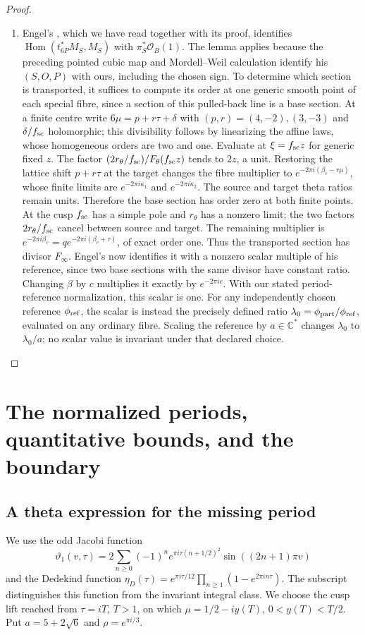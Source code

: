 \begin{proof}
\begin{enumerate}[label=\arabic*.,leftmargin=*]
\item Engel's \cite[Lemma 2.1]{Engel2026}, which we have read together with its proof, identifies $\operatorname{Hom}(t_{6P}^*M_S,M_S)$ with $\pi_S^*\mathcal O_B(1)$. The lemma applies because the preceding pointed cubic map and Mordell--Weil calculation identify his $(S,O,P)$ with ours, including the chosen sign. To determine which section is transported, it suffices to compute its order at one generic smooth point of each special fibre, since a section of this pulled-back line is a base section. At a finite centre write $6\mu=p+r\tau+\delta$ with $(p,r)=(4,-2),(3,-3)$ and $\delta/f_{\rm sc}$ holomorphic; this divisibility follows by linearizing the affine laws, whose homogeneous orders are two and one. Evaluate at $\xi=f_{\rm sc}z$ for generic fixed $z$. The factor $(2r_\theta/f_{\rm sc})/F_\theta(f_{\rm sc}z)$ tends to $2z$, a unit. Restoring the lattice shift $p+r\tau$ at the target changes the fibre multiplier to $e^{-2\pi i(\beta_c-r\mu)}$, whose finite limits are $e^{-2\pi i\kappa_1}$ and $e^{-2\pi i\kappa_2}$. The source and target theta ratios remain units. Therefore the base section has order zero at both finite points. At the cusp $f_{\rm sc}$ has a simple pole and $r_\theta$ has a nonzero limit; the two factors $2r_\theta/f_{\rm sc}$ cancel between source and target. The remaining multiplier is
$e^{-2\pi i\beta_c}=q e^{-2\pi i(\beta_c+\tau)}$, of exact order one. Thus the transported section has divisor $F_\infty$. Engel's \cite[Corollary 2.2]{Engel2026} now identifies it with a nonzero scalar multiple of his reference, since two base sections with the same divisor have constant ratio. Changing $\beta$ by $c$ multiplies it exactly by $e^{-2\pi ic}$. With our stated period-reference normalization, this scalar is one. For any independently chosen reference $\phi_{\rm ref}$, the scalar is instead the precisely defined ratio $\lambda_0=\phi_{\rm part}/\phi_{\rm ref}$, evaluated on any ordinary fibre. Scaling the reference by $a\in\mathbb C^*$ changes $\lambda_0$ to $\lambda_0/a$; no scalar value is invariant under that declared choice.
\end{enumerate}
\end{proof}


\section{The normalized periods, quantitative bounds, and the boundary}\label{fam:section:C}

\subsection{A theta expression for the missing period}\label{fam:section:C.1}
We use the odd Jacobi function
\[
 \vartheta_1(v,\tau)=2\sum_{n\geq0}(-1)^n
 e^{\pi i\tau(n+1/2)^2}\sin((2n+1)\pi v)
\]
and the Dedekind function
\(\eta_D(\tau)=e^{\pi i\tau/12}\prod_{n\geq1}(1-e^{2\pi in\tau})\).
The subscript distinguishes this function from the invariant integral class.
We choose the cusp lift reached from \(\tau=iT\), \(T>1\), on which
\(\mu=1/2-iy(T)\), \(0<y(T)<T/2\). Put
\(a=5+2\sqrt6\) and \(\rho=e^{\pi i/3}\).

